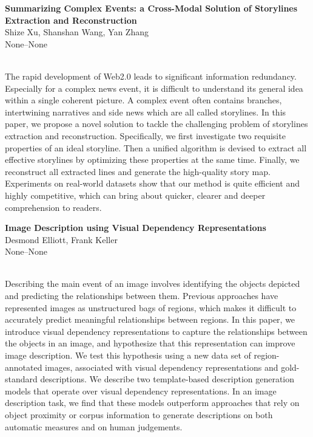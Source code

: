 \documentclass[twoside,makeidx]{book}
\renewcommand{\normalsize}{\fontsize{8}{9}\selectfont}
\renewcommand{\small}{\fontsize{7}{8}\selectfont}
\begin{document}
\par\vspace{2em}\noindent%
\begin{minipage}{\linewidth}%
\begin{center}
\textbf{\normalsize Summarizing Complex Events: a Cross-Modal Solution of Storylines Extraction and Reconstruction}\\
\normalsize  Shize Xu,  Shanshan Wang,  Yan Zhang\\
{\small None--None}\\
\end{center}
\end{minipage}\\[0.5em]
\nopagebreak%
\noindent%
{\small The rapid development of Web2.0 leads to significant information redundancy. Especially for a complex news event, it is difficult to understand its general idea within a single coherent picture. A complex event often contains branches, intertwining narratives and side news which are all called storylines. In this paper, we propose a novel solution to tackle the challenging problem of storylines extraction and reconstruction. Specifically, we first investigate two requisite properties of an ideal storyline. Then a unified algorithm is devised to extract all effective storylines by optimizing these properties at the same time. Finally, we reconstruct all extracted lines and generate the high-quality story map. Experiments on real-world datasets show that our method is quite efficient and highly competitive, which can bring about quicker, clearer and deeper comprehension to readers.}
\par\vspace{2em}\noindent%
\begin{minipage}{\linewidth}%
\begin{center}
\textbf{\normalsize Image Description using Visual Dependency Representations}\\
\normalsize  Desmond Elliott,  Frank Keller\\
{\small None--None}\\
\end{center}
\end{minipage}\\[0.5em]
\nopagebreak%
\noindent%
{\small Describing the main event of an image involves identifying the objects depicted and predicting the relationships between them. Previous approaches have represented images as unstructured bags of regions, which makes it difficult to accurately predict meaningful relationships between regions. In this paper, we introduce visual dependency representations to capture the relationships between the objects in an image, and hypothesize that this representation can improve image description.  We test this hypothesis using a new data set of region-annotated images, associated with visual dependency representations and gold-standard descriptions. We describe two template-based description generation models that operate over visual dependency representations. In an image description task, we find that these models outperform approaches that rely on object proximity or corpus information to generate descriptions on both automatic measures and on human judgements.}
\end{document}
